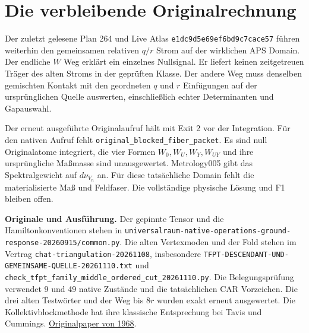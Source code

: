 \documentclass[11pt,a4paper]{article}
\begin{document}
\section*{Die verbleibende Originalrechnung}
Der zuletzt gelesene Plan 264 und Live Atlas \nolinkurl{e1dc9d5e69ef6bd9c7cace57} führen weiterhin den gemeinsamen relativen $q/r$ Strom auf der wirklichen APS Domain. Der endliche $W$ Weg erklärt ein einzelnes Nullsignal. Er liefert keinen zeitgetreuen Träger des alten Stroms in der geprüften Klasse. Der andere Weg muss denselben gemischten Kontakt mit den geordneten $q$ und $r$ Einfügungen auf der ursprünglichen Quelle auswerten, einschließlich echter Determinanten und Gapauswahl.

Der erneut ausgeführte Originalaufruf hält mit Exit 2 vor der Integration. Für den nativen Aufruf fehlt \nolinkurl{original_blocked_fiber_packet}. Es sind null Originalatome integriert, die vier Formen $W_0,W_U,W_Y,W_{UY}$ und ihre ursprüngliche Maßmasse sind unausgewertet. Metrology005 gibt das Spektralgewicht auf $d\nu_{V_n}$ an. Für diese tatsächliche Domain fehlt die materialisierte Maß und Feldfaser. Die vollständige physische Lösung und F1 bleiben offen.

\small
\textbf{Originale und Ausführung.} Der gepinnte Tensor und die Hamiltonkonventionen stehen in \nolinkurl{universalraum-native-operations-ground-response-20260915/common.py}. Die alten Vertexmoden und der Fold stehen im Vertrag \nolinkurl{chat-triangulation-20261108}, insbesondere \nolinkurl{TFPT-DESCENDANT-UND-GEMEINSAME-QUELLE-20261110.txt} und \nolinkurl{check_tfpt_family_middle_ordered_cut_20261110.py}. Die Belegungsprüfung verwendet 9 und 49 native Zustände und die tatsächlichen CAR Vorzeichen. Die drei alten Testwörter und der Weg bis $8r$ wurden exakt erneut ausgewertet. Die Kollektivblockmethode hat ihre klassische Entsprechung bei Tavis und Cummings. \href{https://doi.org/10.1103/PhysRev.170.379}{Originalpaper von 1968}.
\end{document}
